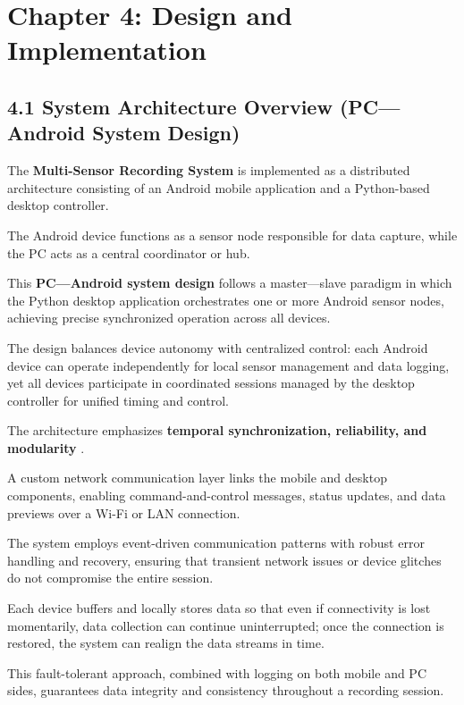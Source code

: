 \label{chap:4} \chapter{Chapter 4: Design and Implementation}

 \section{4.1 System Architecture Overview (PC---Android System Design)}

The \textbf{Multi-Sensor Recording System}
 is implemented as a distributed architecture consisting of an Android mobile
 application and a Python-based desktop controller.

The Android device functions as a sensor node responsible for data capture, while the
PC acts as a central coordinator or hub.

This \textbf{PC---Android system design}
 follows a master---slave paradigm in which the Python desktop application
 orchestrates one or more Android sensor nodes, achieving precise synchronized
 operation across all devices.

The design balances device autonomy with centralized control: each Android device can
operate independently for local sensor management and data logging, yet all devices
participate in coordinated sessions managed by the desktop controller for unified
timing and control.

The architecture emphasizes \textbf{temporal synchronization, reliability, and
modularity}
.

A custom network communication layer links the mobile and desktop components,
enabling command-and-control messages, status updates, and data previews over a Wi-Fi
or LAN connection.

The system employs event-driven communication patterns with robust error handling and
recovery, ensuring that transient network issues or device glitches do not compromise
the entire session.

Each device buffers and locally stores data so that even if connectivity is lost
momentarily, data collection can continue uninterrupted; once the connection is
restored, the system can realign the data streams in time.

This fault-tolerant approach, combined with logging on both mobile and PC
sides, guarantees data integrity and consistency throughout a recording session.

